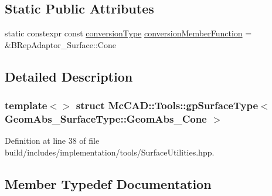 \subsection*{Static Public Attributes}
\begin{DoxyCompactItemize}
\item 
static constexpr const \hyperlink{structMcCAD_1_1Tools_1_1gpSurfaceType_3_01GeomAbs__SurfaceType_1_1GeomAbs__Cone_01_4_ac8a1ab6a2261261ea3b9d10002f0f89d}{conversion\+Type} \hyperlink{structMcCAD_1_1Tools_1_1gpSurfaceType_3_01GeomAbs__SurfaceType_1_1GeomAbs__Cone_01_4_adcb370b376ee5075c5cdbc3cf9179ad8}{conversion\+Member\+Function} = \&B\+Rep\+Adaptor\+\_\+\+Surface\+::\+Cone
\end{DoxyCompactItemize}


\subsection{Detailed Description}
\subsubsection*{template$<$$>$\newline
struct Mc\+C\+A\+D\+::\+Tools\+::gp\+Surface\+Type$<$ Geom\+Abs\+\_\+\+Surface\+Type\+::\+Geom\+Abs\+\_\+\+Cone $>$}



Definition at line 38 of file build/includes/implementation/tools/\+Surface\+Utilities.\+hpp.



\subsection{Member Typedef Documentation}
\mbox{\label{structMcCAD_1_1Tools_1_1gpSurfaceType_3_01GeomAbs__SurfaceType_1_1GeomAbs__Cone_01_4_ac8a1ab6a2261261ea3b9d10002f0f89d}} 
